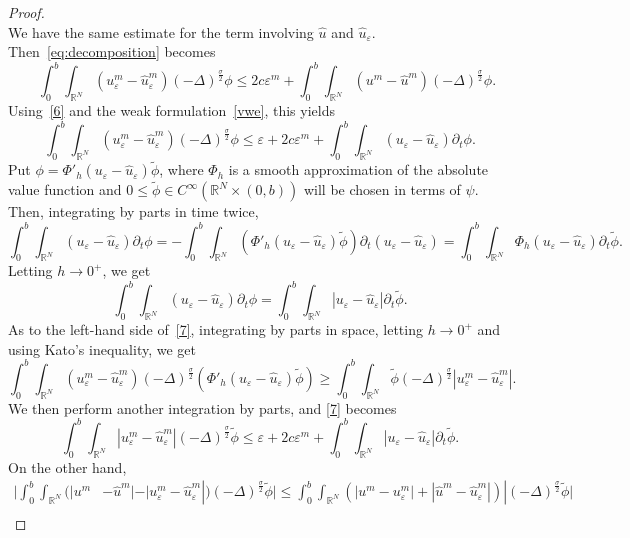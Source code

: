 \documentclass[leqno,12pt]{amsart}
\theoremstyle{definition}
\theoremstyle{remark}
\numberwithin{equation}{section}
\begin{document}
\begin{proof}
\[\]
We have the same estimate for the term involving $\hat u$ and $\hat u_\varepsilon$. Then~\eqref{eq:decomposition} becomes
$$
    \quad \int_{0}^{b}\int_{\mathbb{R}^N}(u_{\varepsilon}^m-\hat{u}_{\varepsilon}^m)(-\Delta)^{\frac\sigma2}\phi\leq 2c\varepsilon^m+ \int_{0}^{b}\int_{\mathbb{R}^N}(u^m-\hat{u}^m)(-\Delta)^{\frac\sigma2}\phi.
$$
Using~\eqref{6} and the weak formulation~\eqref{vwe}, this yields
\begin{equation}\label{7}
    \int_{0}^{b}\int_{\mathbb{R}^N}(u_{\varepsilon}^m-\hat{u}_{\varepsilon}^m)(-\Delta)^{\frac\sigma2}\phi\leq\varepsilon+2c\varepsilon^m+ \int_{0}^{b}\int_{\mathbb{R}^N}(u_{\varepsilon}-\hat{u}_{\varepsilon})\partial_t\phi.
\end{equation}
Put  $\phi=\Phi'_h(u_{\varepsilon}-\hat{u}_{\varepsilon})\tilde{\phi}$, where $\Phi_h$ is a smooth approximation of the absolute value function and $0\leq \tilde{\phi}\in C^\infty(\mathbb{R}^N\times(0,b))$ will be chosen in terms of $\psi$. Then,
integrating by parts in time twice,
$$
    \int_{0}^{b}\int_{\mathbb{R}^N}(u_{\varepsilon}-\hat{u}_{\varepsilon})\partial_t\phi= - \int_{0}^{b}\int_{\mathbb{R}^N}(\Phi'_h(u_{\varepsilon}-\hat{u}_{\varepsilon})\tilde{\phi})\partial_t(u_{\varepsilon}-\hat{u}_{\varepsilon})= \int_{0}^{b}\int_{\mathbb{R}^N}\Phi_h(u_{\varepsilon}-  \hat{u}_{\varepsilon})\partial_t\tilde{\phi}.
$$
Letting $h\to0^+$, we get
$$
    \displaystyle\int_{0}^{b}\int_{\mathbb{R}^N}(u_{\varepsilon}-\hat{u}_{\varepsilon})\partial_t\phi =  \int_{0}^{b}\int_{\mathbb{R}^N}|u_{\varepsilon}-  \hat{u}_{\varepsilon}|\partial_t\tilde{\phi}.
$$
As to the left-hand side of~\eqref{7}, integrating by parts in space, letting $h\to0^+$ and using Kato's inequality, we get
$$
    \int_{0}^{b}\int_{\mathbb{R}^N}(u_{\varepsilon}^m-\hat{u}_{\varepsilon}^m)(-\Delta)^{\frac\sigma2}\left(\Phi'_h(u_{\varepsilon}-\hat{u}_{\varepsilon})\tilde{\phi}\right)\ge\int_{0}^{b}\int_{\mathbb{R}^N}\tilde{\phi}(-\Delta)^{\frac\sigma2}|u_{\varepsilon}^m-\hat{u}_{\varepsilon}^m|.
$$
We then perform another integration by parts, and \eqref{7} becomes
\begin{equation}\label{eq:aproximadas}
    \int_{0}^{b}\int_{\mathbb{R}^N}|u_{\varepsilon}^m-\hat{u}_{\varepsilon}^m|(-\Delta)^{\frac\sigma2}\tilde{\phi}\leq \varepsilon+2c\varepsilon^m+ \int_{0}^{b}\int_{\mathbb{R}^N}|u_{\varepsilon}-\hat{u}_{\varepsilon}|\partial_t\tilde{\phi}.
\end{equation}
On the other hand, 
\begin{align*}
    \Big|\int_{0}^{b}\int_{\mathbb{R}^N}(|u^m&-\hat{u}^m|-|u_{\varepsilon}^m-\hat{u}_{\varepsilon}^m|)(-\Delta)^{\frac\sigma2}\tilde{\phi}\Big| \le  \int_{0}^{b}\int_{\mathbb{R}^N}(|u^m-u_{\varepsilon}^m|+|\hat{u}^m-\hat{u}_{\varepsilon}^m|)|(-\Delta)^{\frac\sigma2}\tilde\phi|\\

\end{align*}
\end{proof}
\end{document}
